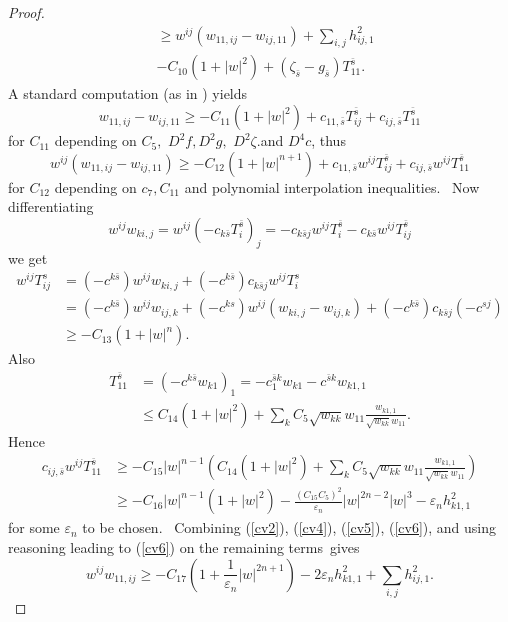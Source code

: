 \documentclass[11pt,letterpaper]{amsart}%
\numberwithin{equation}{section}
\begin{document}
\begin{proof}
\begin{align}
&  \geq w^{ij}(w_{11,ij}-w_{ij,11})+\sum_{i,j}h^2_{ij,1}\nonumber\\
&  -C_{10}(1+\left\vert w\right\vert ^{2})+\left(  \zeta_{\bar{s}}-g_{\bar{s}%
}\right)  T_{11}^{\bar{s}} .\label{cv2}%
\end{align}
A standard computation (as in \cite{MTW}) yields%
\[
w_{11,ij}-w_{ij,11}\geq-C_{11}(1+\left\vert w\right\vert ^{2})+c_{11,\bar{s}%
}T_{ij}^{\bar{s}}+c_{ij,\bar{s}}T_{11}^{\bar{s}}%
\]
for $C_{11}$ depending on $C_{5},$ $D^{2}f,D^{2}g,$ $D^{2}\zeta.$and $D^{4}c$,
thus%
\begin{equation}
w^{ij}(w_{11,ij}-w_{ij,11})\geq-C_{12}(1+\left\vert w\right\vert
^{n+1})+c_{11,\bar{s}}w^{ij}T_{ij}^{\bar{s}}+c_{ij,\bar{s}}w^{ij}T_{11}^{\bar{s}}
\label{cv4}%
\end{equation}
for $C_{12}$ depending on $c_{7}, C_{11}$ and polynomial interpolation inequalities. \ Now
differentiating
\[
w^{ij}w_{ki,j}=w^{ij}\left(  -c_{k\bar{s}}T_{i}^{\bar{s}}\right)  _{j}=-c_{k\bar
{s}j}w^{ij}T_{i}^{\bar{s}}-c_{k\bar{s}}w^{ij}T_{ij}^{\bar{s}}%
\]
we get
\begin{align}
w^{ij}T_{ij}^{s}  &  =\left(  -c^{k \bar{s}}\right)  w^{ij}w_{ki,j}+\left(  -c^{k \bar{s}}\right)c_{k\bar{s}%
j}w^{ij}T_{i}^{s}\nonumber\\
&  =\left(  -c^{k \bar{s}}\right)  w^{ij}w_{ij,k}+\left(  -c^{ks}\right)
w^{ij}\left(  w_{ki,j}-w_{ij,k}\right)  +\left(  -c^{k \bar{s}}\right)c_{k\bar{s}j}\left(  -c^{sj}\right)
\nonumber\\
&  \geq-C_{13}(1+\left\vert w\right\vert ^{n}). \label{cv5}%
\end{align}
Also
\begin{align*}
T_{11}^{\bar{s}}  &  =\left( - c^{k\bar{s}}w_{k1}\right)  _{1}=-c_{1}^{\bar{s}k}%
w_{k1}-c^{\bar{s}k}w_{k1,1}\\
&  \leq C_{14}\left(  1+\left\vert w\right\vert ^{2}\right)  +\sum_{k}%
C_{5}\sqrt{w_{kk}}w_{11}\frac{w_{k1,1}}{\sqrt{w_{kk}}w_{11}}.
\end{align*}
Hence
\begin{align}
c_{ij,\bar{s}}w^{ij}T_{11}^{\bar{s}}  &  \geq-C_{15}\left\vert w\right\vert
^{n-1}\left(  C_{14}\left(  1+\left\vert w\right\vert ^{2}\right)  +\sum
_{k}C_{5}\sqrt{w_{kk}}w_{11}\frac{w_{k1,1}}{\sqrt{w_{kk}}w_{11}}\right)
\nonumber\\
&  \geq-C_{16}\left\vert w\right\vert ^{n-1}\left(  1+\left\vert w\right\vert
^{2}\right)  -\frac{\left(  C_{15}C_{5}\right)  ^{2}}{\varepsilon_{n}%
}\left\vert w\right\vert ^{2n-2}\left\vert w\right\vert ^{3}-\varepsilon
_{n}h_{k1,1}^{2} \label{cv6}%
\end{align}
for some $\varepsilon_{n}$ to be chosen. \ Combining (\ref{cv2}), (\ref{cv4}),
(\ref{cv5}), (\ref{cv6}), and using reasoning leading to (\ref{cv6}) on the remaining terms\ gives
\begin{equation}
w^{ij}w_{11,ij}\geq-C_{17}\left(  1+\frac{1}{\varepsilon_{n}}\left\vert
w\right\vert ^{2n+1}\right)  -2\varepsilon_{n}h_{k1,1}^{2}+\sum_{i,j}%
h_{ij,1}^{2}. \label{there}%
\end{equation}



\end{proof}
\end{document}
